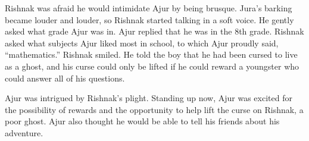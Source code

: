 Rishnak was afraid he would intimidate Ajur by being brusque. Jura's barking became louder and louder, so Rishnak started talking in a soft voice. He gently asked what grade Ajur was in. Ajur replied that he was in the 8th grade. Rishnak asked what subjects Ajur liked most in school, to which Ajur proudly said, ``mathematics.'' Rishnak smiled. He told the boy that he had been cursed to live as a ghost, and his curse could only be lifted if he could reward a youngster who could answer all of his questions.

Ajur was intrigued by Rishnak's plight. Standing up now, Ajur was excited for the possibility of rewards and the opportunity to help lift the curse on Rishnak, a poor ghost. Ajur also thought he would be able to tell his friends about his adventure.